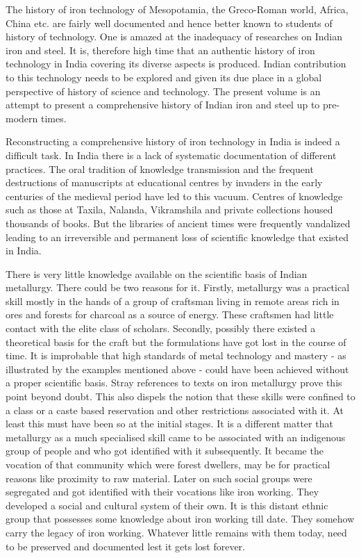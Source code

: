 The history of iron technology of Mesopotamia, the Greco-Roman world, Africa, China etc. are fairly well documented and hence better known to students of history of technology. One is amazed at the inadequacy of researches on Indian iron and steel. It is, therefore high time that an authentic history of iron technology in India covering its diverse aspects is produced. Indian contribution to this technology needs to be explored and given its due place in a global perspective of history of science and technology. The present volume is an attempt to present a comprehensive history of Indian iron and steel up to pre-modern times.

Reconstructing a comprehensive history of iron technology in India is indeed a difficult task. In India there is a lack of systematic documentation of different practices. The oral tradition of knowledge transmission and the frequent destructions of manuscripts at educational centres by invaders in the early centuries of the medieval period have led to this vacuum. Centres of knowledge such as those at Taxila, Nalanda, Vikramshila and private collections housed thousands of books. But the libraries of ancient times were frequently vandalized leading to an irreversible and permanent loss of scientific knowledge that existed in India.

There is very little knowledge available on the scientific basis of Indian metallurgy. There could be two reasons for it. Firstly, metallurgy was a practical skill mostly in the hands of a group of craftsman living in remote areas rich in ores and forests for charcoal as a source of energy. These craftsmen had little contact with the elite class of scholars. Secondly, possibly there existed a theoretical basis for the craft but the formulations have got lost in the course of time. It is improbable that high standards of metal technology and mastery - as illustrated by the examples mentioned above - could have been achieved without a proper scientific basis. Stray references to texts on iron metallurgy prove this point beyond doubt. This also dispels the notion that these skills were confined to a class or a caste based reservation and other restrictions associated with it. At least this must have been so at the initial stages. It is a different matter that metallurgy as a much specialised skill came to be associated with an indigenous  group of people and who got identified with it subsequently. It became the vocation of that community which were forest dwellers, may be for practical reasons like proximity to raw material. Later on such social groups were segregated and got identified with their vocations like iron working. They developed a social and cultural system of their own. It is this distant ethnic group that possesses some knowledge about iron working till date. They somehow carry the legacy of iron working. Whatever little remains with them today, need to be preserved and documented lest it gets lost forever.

